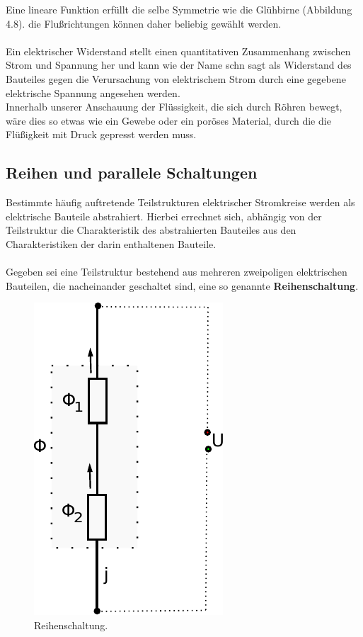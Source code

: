 \documentclass[11pt,a4paper,leqno]{report}
\numberwithin{equation}{chapter}
\begin{document}
\noindent
Eine lineare Funktion erf\"ullt die selbe Symmetrie wie die Gl\"uhbirne (Abbildung 4.8). die Flu\ss{}richtungen k\"onnen daher beliebig gew\"ahlt werden.\\
\\
Ein elektrischer Widerstand stellt einen quantitativen Zusammenhang zwischen Strom und Spannung her und kann wie der Name schn sagt als Widerstand des Bauteiles gegen die Verursachung von elektrischem Strom durch eine gegebene elektrische Spannung angesehen werden.\\
Innerhalb unserer Anschauung der Fl\"ussigkeit, die sich durch R\"ohren bewegt, w\"are dies so etwas wie ein Gewebe oder ein por\"oses Material, durch die die Fl\"u\ss{}igkeit mit Druck gepresst werden muss.
\subsection{Reihen und parallele Schaltungen}
Bestimmte h\"aufig auftretende Teilstrukturen elektrischer Stromkreise werden als elektrische Bauteile abstrahiert. Hierbei errechnet sich, abh\"angig von der Teilstruktur die Charakteristik des abstrahierten Bauteiles aus den Charakteristiken der darin enthaltenen Bauteile.\\
\\
Gegeben sei eine Teilstruktur bestehend aus mehreren zweipoligen elektrischen Bauteilen, die nacheinander geschaltet sind, eine so genannte \textbf{Reihenschaltung}.
\begin{figure}[H]
	\begin{center}
		\includegraphics[scale=0.75]{Bilder/reihe.pdf}
		\caption{Reihenschaltung.}
	\end{center}
\end{figure}
\end{document}
